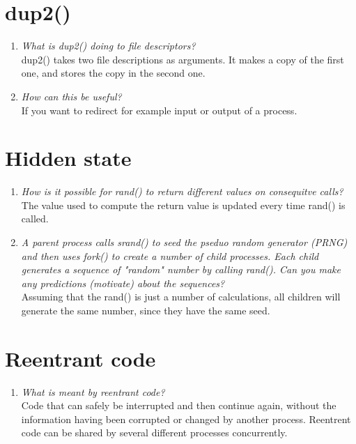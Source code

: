 \documentclass[a4paper]{article}
\begin{document}
\section{dup2()}
\begin{enumerate}
  \item \textit{What is dup2() doing to file descriptors?} \\
    dup2() takes two file descriptions as arguments. It makes a copy of the first one, and stores the copy in the second one. 
  \item \textit{How can this be useful?} \\
    If you want to redirect for example input or output of a process. 
\end{enumerate}

\section{Hidden state}
\begin{enumerate} 
  \item \textit{ How is it possible for rand() to return different values on consequitve calls?} \\
    The value used to compute the return value is updated every time rand() is called. 
  \item \textit{A parent process calls srand() to seed the pseduo random generator (PRNG) and then uses fork() to create a number of child processes. Each child generates a sequence of "random" number by calling rand(). Can you make any predictions (motivate) about the sequences?} \\
    Assuming that the rand() is just a number of calculations, all children will generate the same number, since they have the same seed.      
  
\end{enumerate}

\section{Reentrant code}
\begin{enumerate}
\item \textit{What is meant by reentrant code?} \\
  Code that can safely be interrupted and then continue again, without the information having been corrupted or changed by another process. Reentrent code can be shared by several different processes concurrently.
\end{enumerate}
\end{document}
